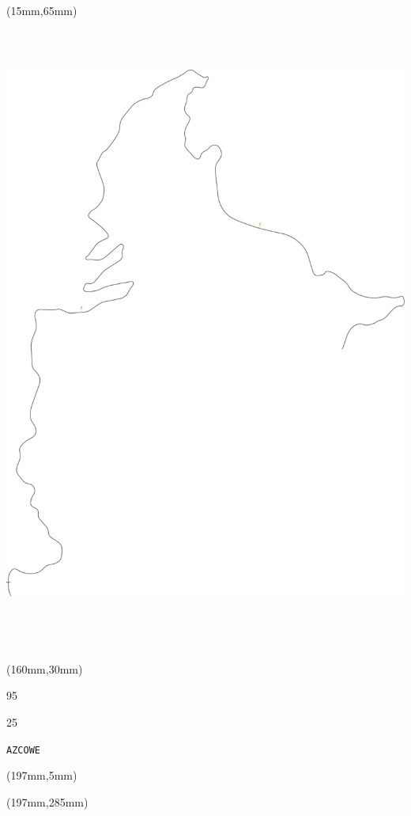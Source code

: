 \begin{textblock*}{185mm}(15mm,65mm)%
\centering
\mbox{\includegraphics[width=185mm,height=210mm,keepaspectratio]{PT/AZCOWE.pdf}}
\end{textblock*}
\begin{textblock*}{40mm}(160mm,30mm)%
\Large
\par{} 
\par95 
\par25 
\par\hfill\tiny\tt AZCOWE\\
\end{textblock*}
\begin{textblock*}{20mm}(197mm,5mm)%
\fbox{\thepage}
\label{AZCOWE}
\end{textblock*}
\begin{textblock*}{20mm}(197mm,285mm)%
\fbox{\thepage}
\end{textblock*}


